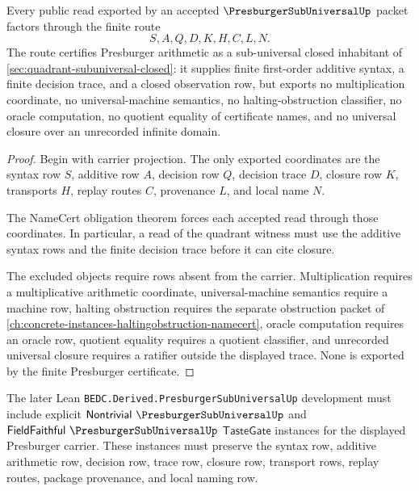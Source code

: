 \begin{theorem}
\label{thm:presburger-quadrant-nonescape}
Every public read exported by an accepted $\PresburgerSubUniversalUp$ packet factors through the finite route
$$
S,A,Q,D,K,H,C,L,N .
$$
The route certifies Presburger arithmetic as a sub-universal closed inhabitant of \autoref{sec:quadrant-subuniversal-closed}: it supplies finite first-order additive syntax, a finite decision trace, and a closed observation row, but exports no multiplication coordinate, no universal-machine semantics, no halting-obstruction classifier, no oracle computation, no quotient equality of certificate names, and no universal closure over an unrecorded infinite domain.
\end{theorem}
\begin{proof}
Begin with carrier projection. The only exported coordinates are the syntax row $S$, additive row $A$, decision row $Q$, decision trace $D$, closure row $K$, transports $H$, replay routes $C$, provenance $L$, and local name $N$.

The NameCert obligation theorem forces each accepted read through those coordinates. In particular, a read of the quadrant witness must use the additive syntax rows and the finite decision trace before it can cite closure.

The excluded objects require rows absent from the carrier. Multiplication requires a multiplicative arithmetic coordinate, universal-machine semantics require a machine row, halting obstruction requires the separate obstruction packet of \autoref{ch:concrete-instances-haltingobstruction-namecert}, oracle computation requires an oracle row, quotient equality requires a quotient classifier, and unrecorded universal closure requires a ratifier outside the displayed trace. None is exported by the finite Presburger certificate.
\end{proof}

The later Lean \texttt{BEDC.Derived.PresburgerSubUniversalUp} development must include explicit $\mathsf{Nontrivial}\ \PresburgerSubUniversalUp$ and $\mathsf{FieldFaithful}\ \PresburgerSubUniversalUp$ $\mathsf{TasteGate}$ instances for the displayed Presburger carrier. These instances must preserve the syntax row, additive arithmetic row, decision row, trace row, closure row, transport rows, replay routes, package provenance, and local naming row.


